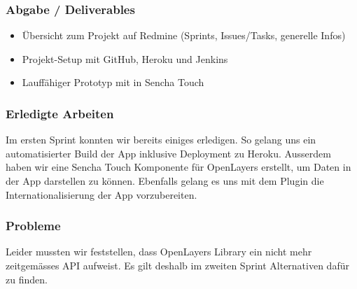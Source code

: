 \subsubsection{Abgabe / Deliverables}

\begin{itemize}
	\item Übersicht zum Projekt auf Redmine (Sprints, Issues/Tasks, generelle Infos)
	\item Projekt-Setup mit GitHub, Heroku und Jenkins
	\item Lauffähiger Prototyp mit  in Sencha Touch
\end{itemize}

\subsubsection{Erledigte Arbeiten}
Im ersten Sprint konnten wir bereits einiges erledigen. So gelang uns ein automatisierter Build der App inklusive Deployment zu Heroku. Ausserdem haben wir eine Sencha Touch Komponente für OpenLayers erstellt, um  Daten in der App darstellen zu können. Ebenfalls gelang es uns mit dem Plugin  die Internationalisierung der App vorzubereiten.

\subsubsection{Probleme}
Leider mussten wir feststellen, dass OpenLayers Library ein nicht mehr zeitgemässes \gls{API} aufweist. Es gilt deshalb im zweiten Sprint Alternativen dafür zu finden.